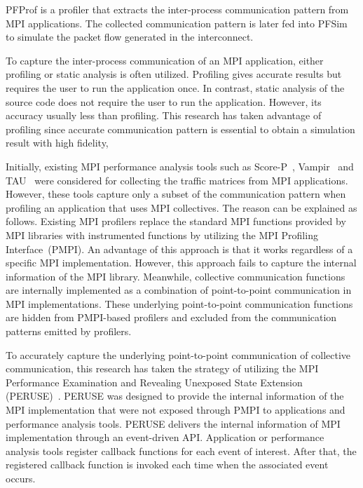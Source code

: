 PFProf is a profiler that extracts the inter-process communication pattern
from MPI applications. The collected communication pattern is later fed into
PFSim to simulate the packet flow generated in the interconnect.

To capture the inter-process communication of an MPI application, either
profiling or static analysis is often utilized. Profiling gives accurate
results but requires the user to run the application once. In contrast, static
analysis of the source code does not require the user to run the application.
However, its accuracy usually less than profiling. This research has taken
advantage of profiling since accurate communication pattern is essential to
obtain a simulation result with high fidelity,

Initially, existing MPI performance analysis tools such as
\mbox{Score-P}~\autocite{Knupfer2012}, Vampir~\autocite{Knupfer2008} and
TAU~\autocite{Shende2006} were considered for collecting the traffic matrices
from MPI applications. However, these tools capture only a subset of the
communication pattern when profiling an application that uses MPI collectives.
The reason can be explained as follows. Existing MPI profilers replace
the standard MPI functions provided by MPI libraries with instrumented
functions by utilizing the MPI Profiling Interface~(PMPI). An advantage
of this approach is that it works regardless of a specific MPI
implementation. However, this approach fails to capture the internal
information of the MPI library. Meanwhile, collective communication
functions are internally implemented as a combination of point-to-point
communication in MPI implementations. These underlying point-to-point
communication functions are hidden from PMPI-based profilers and
excluded from the communication patterns emitted by profilers.

To accurately capture the underlying point-to-point communication of
collective communication, this research has taken the strategy of utilizing
the MPI Performance Examination and Revealing Unexposed State Extension
(PERUSE)~\autocite{Jones2006}. PERUSE was designed to provide the internal
information of the MPI implementation that were not exposed through PMPI to
applications and performance analysis tools. PERUSE delivers the internal
information of MPI implementation through an event-driven API\@. Application
or performance analysis tools register callback functions for each event of
interest. After that, the registered callback function is invoked each time
when the associated event occurs.

